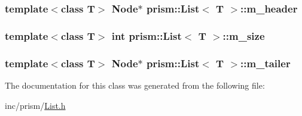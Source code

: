 \subsubsection[{\texorpdfstring{m\+\_\+header}{m_header}}]{\setlength{\rightskip}{0pt plus 5cm}template$<$class T$>$ Node$\ast$ {\bf prism\+::\+List}$<$ T $>$\+::m\+\_\+header\hspace{0.3cm}{\ttfamily [protected]}}\hypertarget{classprism_1_1_list_ade9dd1234d468fdcbcddb16eb490d296}{}\label{classprism_1_1_list_ade9dd1234d468fdcbcddb16eb490d296}
\subsubsection[{\texorpdfstring{m\+\_\+size}{m_size}}]{\setlength{\rightskip}{0pt plus 5cm}template$<$class T$>$ int {\bf prism\+::\+List}$<$ T $>$\+::m\+\_\+size\hspace{0.3cm}{\ttfamily [protected]}}\hypertarget{classprism_1_1_list_ae86f48e50ec12239597de98deb36b4a4}{}\label{classprism_1_1_list_ae86f48e50ec12239597de98deb36b4a4}
\subsubsection[{\texorpdfstring{m\+\_\+tailer}{m_tailer}}]{\setlength{\rightskip}{0pt plus 5cm}template$<$class T$>$ Node$\ast$ {\bf prism\+::\+List}$<$ T $>$\+::m\+\_\+tailer\hspace{0.3cm}{\ttfamily [protected]}}\hypertarget{classprism_1_1_list_a0740989f0d5af2bad19850fac850947e}{}\label{classprism_1_1_list_a0740989f0d5af2bad19850fac850947e}


The documentation for this class was generated from the following file\+:\begin{DoxyCompactItemize}
\item 
inc/prism/\hyperlink{_list_8h}{List.\+h}\end{DoxyCompactItemize}
